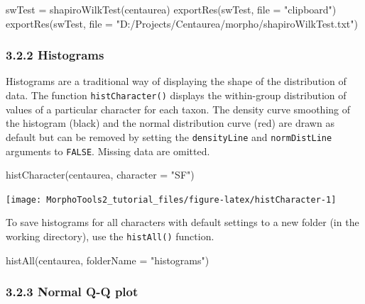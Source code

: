 \documentclass[
  11pt,
  a4paper]{article}
\newenvironment{Shaded}{\begin{snugshade}}{\end{snugshade}}
\newcommand{\AttributeTok}[1]{\textcolor[rgb]{0.77,0.63,0.00}{#1}}
\newcommand{\FunctionTok}[1]{\textcolor[rgb]{0.00,0.00,0.00}{#1}}
\newcommand{\NormalTok}[1]{#1}
\newcommand{\OtherTok}[1]{\textcolor[rgb]{0.56,0.35,0.01}{#1}}
\newcommand{\StringTok}[1]{\textcolor[rgb]{0.31,0.60,0.02}{#1}}
\begin{document}
\begin{Shaded}
\begin{Highlighting}[]
\NormalTok{swTest }\OtherTok{=} \FunctionTok{shapiroWilkTest}\NormalTok{(centaurea)}
\FunctionTok{exportRes}\NormalTok{(swTest, }\AttributeTok{file =} \StringTok{"clipboard"}\NormalTok{)}
\FunctionTok{exportRes}\NormalTok{(swTest, }\AttributeTok{file =} \StringTok{"D:/Projects/Centaurea/morpho/shapiroWilkTest.txt"}\NormalTok{)}
\end{Highlighting}
\end{Shaded}

\hypertarget{histograms}{%
\subsubsection{3.2.2 Histograms}\label{histograms}}

Histograms are a traditional way of displaying the shape of the
distribution of data. The function \texttt{histCharacter()} displays the
within-group distribution of values of a particular character for each
taxon. The density curve smoothing of the histogram (black) and the
normal distribution curve (red) are drawn as default but can be removed
by setting the \texttt{densityLine} and \texttt{normDistLine} arguments
to \texttt{FALSE}. Missing data are omitted.

\begin{Shaded}
\begin{Highlighting}[]
\FunctionTok{histCharacter}\NormalTok{(centaurea, }\AttributeTok{character =} \StringTok{"SF"}\NormalTok{)}
\end{Highlighting}
\end{Shaded}

\begin{center}\texttt{[image: MorphoTools2\_tutorial\_files/figure-latex/histCharacter-1]} \end{center}

To save histograms for all characters with default settings to a new
folder (in the working directory), use the \texttt{histAll()} function.

\begin{Shaded}
\begin{Highlighting}[]
\FunctionTok{histAll}\NormalTok{(centaurea, }\AttributeTok{folderName =} \StringTok{"histograms"}\NormalTok{)}
\end{Highlighting}
\end{Shaded}

\hypertarget{normal-q-q-plot}{%
\subsubsection{3.2.3 Normal Q-Q plot}\label{normal-q-q-plot}}
\end{document}
